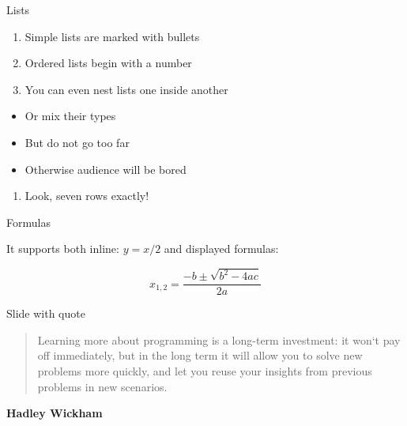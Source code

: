 \documentclass[ignorenonframetext,]{beamer}
\providecommand{\tightlist}{%
  \setlength{\itemsep}{0pt}\setlength{\parskip}{0pt}}
\begin{document}
\begin{frame}{Lists}
\protect\hypertarget{lists}{}

\begin{enumerate}
\tightlist
\item
  Simple lists are marked with bullets
\item
  Ordered lists begin with a number
\item
  You can even nest lists one inside another
\end{enumerate}

\begin{itemize}
\tightlist
\item
  Or mix their types
\item
  But do not go too far
\item
  Otherwise audience will be bored
\end{itemize}

\begin{enumerate}
\tightlist
\item
  Look, seven rows exactly!
\end{enumerate}

\end{frame}

\begin{frame}{Formulas}
\protect\hypertarget{formulas}{}

It supports both inline: \(y = x / 2\) and displayed formulas:

\[ x_{1,2} = \frac{- b \pm \sqrt{b^2 - 4ac}}{2a} \]

\end{frame}

\begin{frame}{Slide with quote}
\protect\hypertarget{slide-with-quote}{}

\begin{quote}
Learning more about programming is a long-term investment: it won`t pay
off immediately, but in the long term it will allow you to solve new
problems more quickly, and let you reuse your insights from previous
problems in new scenarios.
\end{quote}

\textbf{Hadley Wickham}

\end{frame}
\end{document}

